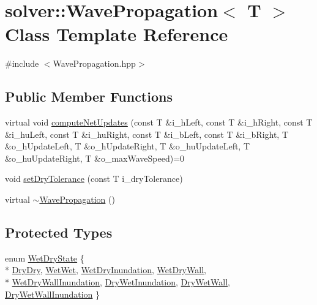 \hypertarget{classsolver_1_1WavePropagation}{}\section{solver\+:\+:Wave\+Propagation$<$ T $>$ Class Template Reference}
\label{classsolver_1_1WavePropagation}


{\ttfamily \#include $<$Wave\+Propagation.\+hpp$>$}

\subsection*{Public Member Functions}
\begin{DoxyCompactItemize}
\item 
virtual void \hyperlink{classsolver_1_1WavePropagation_ace4a0a41b9003d0d7005226b81b982a4}{compute\+Net\+Updates} (const T \&i\+\_\+h\+Left, const T \&i\+\_\+h\+Right, const T \&i\+\_\+hu\+Left, const T \&i\+\_\+hu\+Right, const T \&i\+\_\+b\+Left, const T \&i\+\_\+b\+Right, T \&o\+\_\+h\+Update\+Left, T \&o\+\_\+h\+Update\+Right, T \&o\+\_\+hu\+Update\+Left, T \&o\+\_\+hu\+Update\+Right, T \&o\+\_\+max\+Wave\+Speed)=0
\item 
void \hyperlink{classsolver_1_1WavePropagation_a8f4fefb7e7fa823853b053edbcc53b12}{set\+Dry\+Tolerance} (const T i\+\_\+dry\+Tolerance)
\item 
virtual \hyperlink{classsolver_1_1WavePropagation_a2463938d462872abb6fca8fb88f04aa4}{$\sim$\+Wave\+Propagation} ()
\end{DoxyCompactItemize}
\subsection*{Protected Types}
\begin{DoxyCompactItemize}
\item 
enum \hyperlink{classsolver_1_1WavePropagation_a301203f09c080cff1f7f654ba04451cd}{Wet\+Dry\+State} \{ \\*
\hyperlink{classsolver_1_1WavePropagation_a301203f09c080cff1f7f654ba04451cda89ee27d8ba931e0b79f0f1b9ef0df3c1}{Dry\+Dry}, 
\hyperlink{classsolver_1_1WavePropagation_a301203f09c080cff1f7f654ba04451cda0ad584eeb02f684932bc0cd6608b5aea}{Wet\+Wet}, 
\hyperlink{classsolver_1_1WavePropagation_a301203f09c080cff1f7f654ba04451cda3ee9e6f341abb684450a39e2ccce7ac6}{Wet\+Dry\+Inundation}, 
\hyperlink{classsolver_1_1WavePropagation_a301203f09c080cff1f7f654ba04451cda2164f01921edc5f2a6663e105398ed57}{Wet\+Dry\+Wall}, 
\\*
\hyperlink{classsolver_1_1WavePropagation_a301203f09c080cff1f7f654ba04451cda6f680f0c1ab88d2d3a4706b74a2ebeae}{Wet\+Dry\+Wall\+Inundation}, 
\hyperlink{classsolver_1_1WavePropagation_a301203f09c080cff1f7f654ba04451cdac7251c834852f2ffa316c8d22d2f8b59}{Dry\+Wet\+Inundation}, 
\hyperlink{classsolver_1_1WavePropagation_a301203f09c080cff1f7f654ba04451cdaa862582670f74db35309b69f19745356}{Dry\+Wet\+Wall}, 
\hyperlink{classsolver_1_1WavePropagation_a301203f09c080cff1f7f654ba04451cdabd74beb894d60373cfd4f433da7c6a26}{Dry\+Wet\+Wall\+Inundation}
 \}
\end{DoxyCompactItemize}
